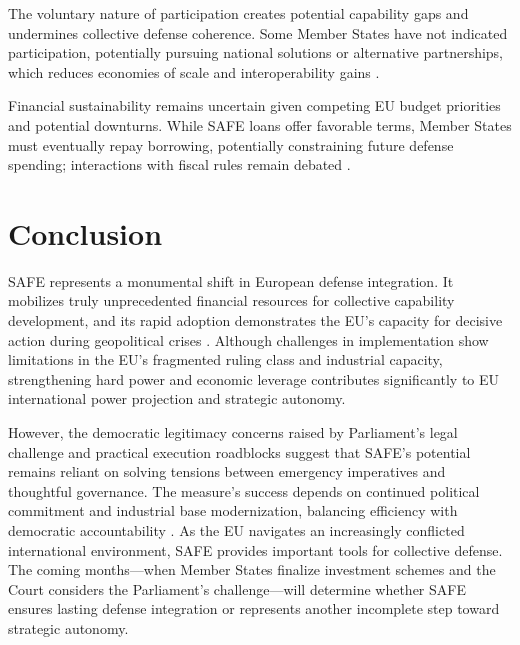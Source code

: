 \documentclass[12pt,a4paper]{article}
\begin{document}
\noindent The voluntary nature of participation creates potential capability gaps and undermines collective defense coherence. Some Member States have not indicated participation, potentially pursuing national solutions or alternative partnerships, which reduces economies of scale and interoperability gains \parencite{euronews2025}.

\noindent Financial sustainability remains uncertain given competing EU budget priorities and potential downturns. While SAFE loans offer favorable terms, Member States must eventually repay borrowing, potentially constraining future defense spending; interactions with fiscal rules remain debated \parencite{verfassungsblog2025}.

\section*{Conclusion}
\noindent SAFE represents a monumental shift in European defense integration. It mobilizes truly unprecedented financial resources for collective capability development, and its rapid adoption demonstrates the EU’s capacity for decisive action during geopolitical crises \parencite{council2025safe}. Although challenges in implementation show limitations in the EU’s fragmented ruling class and industrial capacity, strengthening hard power and economic leverage contributes significantly to EU international power projection and strategic autonomy.

\noindent However, the democratic legitimacy concerns raised by Parliament's legal challenge and practical execution roadblocks suggest that SAFE's potential remains reliant on solving tensions between emergency imperatives and thoughtful governance. The measure's success depends on continued political commitment and industrial base modernization, balancing efficiency with democratic accountability \parencite{eunews2025parliament,verfassungsblog2025}. As the EU navigates an increasingly conflicted international environment, SAFE provides important tools for collective defense. The coming months—when Member States finalize investment schemes and the Court considers the Parliament's challenge—will determine whether SAFE ensures lasting defense integration or represents another incomplete step toward strategic autonomy.

\newpage
\printbibliography[heading=bibintoc,title={References}]
\end{document}
